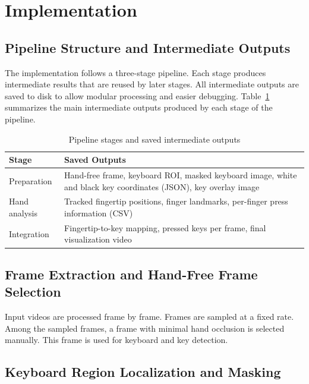 \section{Implementation}

\subsection{Pipeline Structure and Intermediate Outputs}

The implementation follows a three-stage pipeline.
Each stage produces intermediate results
that are reused by later stages.
All intermediate outputs are saved to disk
to allow modular processing and easier debugging. Table~\ref{tab:pipeline_outputs} summarizes the main intermediate outputs
produced by each stage of the pipeline.


\begin{table}[h]
    \centering
    \caption{Pipeline stages and saved intermediate outputs}
    \begin{tabular}{|l|p{5.2cm}|}
    \hline
    \textbf{Stage} & \textbf{Saved Outputs} \\
    \hline
    Preparation &
    Hand-free frame, keyboard ROI, masked keyboard image,
    white and black key coordinates (JSON),
    key overlay image \\
    \hline
    Hand analysis &
    Tracked fingertip positions,
    finger landmarks,
    per-finger press information (CSV) \\
    \hline
    Integration &
    Fingertip-to-key mapping,
    pressed keys per frame,
    final visualization video \\
    \hline
    \end{tabular}
    \label{tab:pipeline_outputs}
\end{table}


\subsection{Frame Extraction and Hand-Free Frame Selection}

Input videos are processed frame by frame.
Frames are sampled at a fixed rate.
Among the sampled frames,
a frame with minimal hand occlusion is selected manually.
This frame is used for keyboard and key detection.

\subsection{Keyboard Region Localization and Masking}

